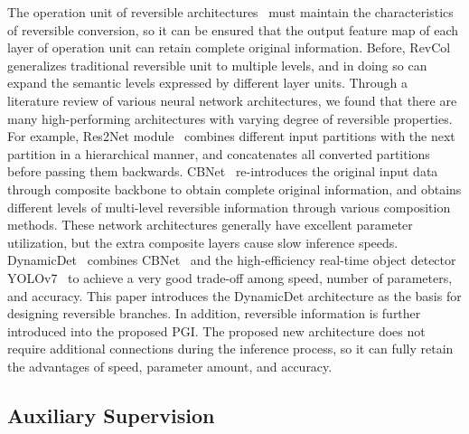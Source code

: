 \documentclass[10pt,twocolumn,letterpaper]{article}
\begin{document}
	The operation unit of reversible architectures~\cite{gomez2017reversible,cai2022reversible,han2023revcolv2} must maintain the characteristics of reversible conversion, so it can be ensured that the output feature map of each layer of operation unit can retain complete original information.  Before, RevCol~\cite{cai2022reversible} generalizes traditional reversible unit to multiple levels, and in doing so can expand the semantic levels expressed by different layer units. Through a literature review of various neural network architectures, we found that there are many high-performing architectures with varying degree of reversible properties.  For example, Res2Net module~\cite{gao2019res2net} combines different input partitions with the next partition in a hierarchical manner, and concatenates all converted partitions before passing them backwards.  CBNet~\cite{liu2020cbnet,liang2021cbnetv2} re-introduces the original input data through composite backbone to obtain complete original information, and obtains different levels of multi-level reversible information through various composition methods.  These network architectures generally have excellent parameter utilization, but the extra composite layers cause slow inference speeds.  DynamicDet~\cite{lin2023dynamicdet} combines CBNet~\cite{liang2021cbnetv2} and the high-efficiency real-time object detector YOLOv7~\cite{wang2023yolov7} to achieve a very good trade-off among speed, number of parameters, and accuracy.  This paper introduces the DynamicDet architecture as the basis for designing reversible branches.  In addition, reversible information is further introduced into the proposed PGI.  The proposed new architecture does not require additional connections during the inference process, so it can fully retain the advantages of speed, parameter amount, and accuracy.
	
	\subsection{Auxiliary Supervision}
	
\end{document}
